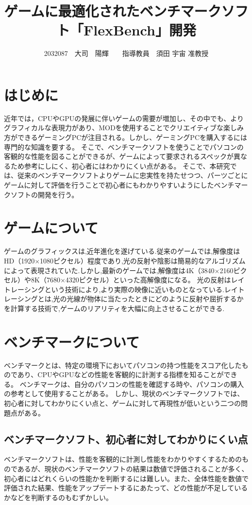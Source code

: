 \documentclass[twocolumn,10pt,a4j]{ltjsarticle}
\title{ゲームに最適化されたベンチマークソフト「FlexBench」開発}
\author{2032087　大司　陽輝　　指導教員　須田 宇宙 准教授}
\date{}
\begin{document}
\maketitle

\section{はじめに}
近年では，CPUやGPUの発展に伴いゲームの需要が増加し、その中でも、よりグラフィカルな表現力があり、MODを使用することでクリエイティブな楽しみ方ができるゲーミングPCが注目される。しかし、ゲーミングPCを購入するには専門的な知識を要する。
そこで、ベンチマークソフトを使うことでパソコンの客観的な性能を図ることができるが、ゲームによって要求されるスペックが異なるため参考にしにく、初心者にはわかりにくい点がある。
そこで、本研究では、従来のベンチマークソフトよりゲームに忠実性を持たせつつ、パーツごとにゲームに対して評価を行うことで初心者にもわかりやすいようにしたベンチマークソフトの開発を行う。

\section{ゲームについて}
ゲームのグラフィックスは,近年進化を遂げている.従来のゲームでは,解像度はHD（1920$\times$1080ピクセル）程度であり,光の反射や陰影は簡易的なアルゴリズムによって表現されていた.しかし,最新のゲームでは,解像度は4K（3840$\times$2160ピクセル）や8K（7680$\times$4320ピクセル）といった高解像度になる。
光の反射はレイトレーシングという技術により,より実際の映像に近いものとなっている.レイトレーシングとは,光の光線が物体に当たったときにどのように反射や屈折するかを計算する技術で,ゲームのリアリティを大幅に向上させることができる.

\section{ベンチマークについて}
ベンチマークとは、特定の環境下においてパソコンの持つ性能をスコア化したものであり、CPUやGPUなどの性能を客観的に計測する指標を知ることができる。
ベンチマークは、自分のパソコンの性能を確認する時や、パソコンの購入の参考として使用することがある。
しかし、現状のベンチマークソフトでは、初心者に対してわかりにくい点と、ゲームに対して再現性が低いという二つの問題点がある。

 \subsection{ベンチマークソフト、初心者に対してわかりにくい点}
ベンチマークソフトは、性能を客観的に計測し性能をわかりやすくするためのものであるが、現状のベンチマークソフトの結果は数値で評価されることが多く、初心者にはどれくらいの性能かを判断するには難しい。また、全体性能を数値で評価された結果、性能をアップデートするにあたって、どの性能が不足しているかなどを判断するのもむずかしい。
\end{document}
